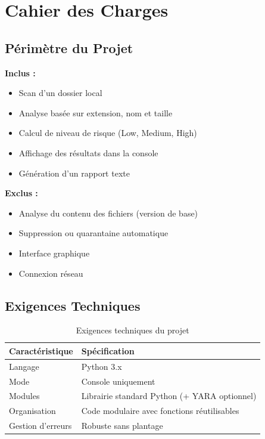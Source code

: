 \documentclass[12pt,a4paper]{report}
\begin{document}
\section{Cahier des Charges}

\subsection{Périmètre du Projet}

\textbf{Inclus :}
\begin{itemize}
    \item Scan d'un dossier local
    \item Analyse basée sur extension, nom et taille
    \item Calcul de niveau de risque (Low, Medium, High)
    \item Affichage des résultats dans la console
    \item Génération d'un rapport texte
\end{itemize}

\textbf{Exclus :}
\begin{itemize}
    \item Analyse du contenu des fichiers (version de base)
    \item Suppression ou quarantaine automatique
    \item Interface graphique
    \item Connexion réseau
\end{itemize}

\subsection{Exigences Techniques}

\begin{table}[h]
\centering
\begin{tabular}{|l|l|}
\hline
\textbf{Caractéristique} & \textbf{Spécification} \\
\hline
Langage & Python 3.x \\
Mode & Console uniquement \\
Modules & Librairie standard Python (+ YARA optionnel) \\
Organisation & Code modulaire avec fonctions réutilisables \\
Gestion d'erreurs & Robuste sans plantage \\
\hline
\end{tabular}
\caption{Exigences techniques du projet}
\end{table}
\end{document}
